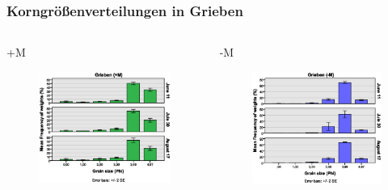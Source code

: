 \documentclass[xcolor=dvipsnames]{beamer}
\begin{document}
\begin{frame}
\frametitle{Korngrößenverteilungen in Grieben}
\begin{columns}
\begin{column}{5.5cm}
+M
\begin{figure}
\includegraphics[width=\textwidth]{images/grainsize/sediment_im_jahr3.eps}
\end{figure}
\end{column}
\begin{column}{5.5cm}
-M
\begin{figure}
\includegraphics[width=\textwidth]{images/grainsize/sediment_im_jahr4.eps}
\end{figure}
\end{column}
\end{columns}
\end{frame}
\end{document}
